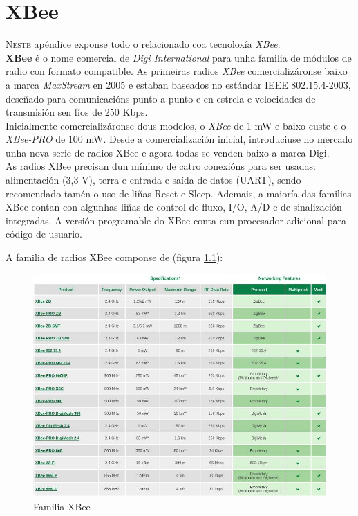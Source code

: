 \chapter{XBee}
\label{chap:xbee}


\lettrine{N}{este} apéndice exponse todo o relacionado coa tecnoloxía
\textit{XBee}. \\

\textbf{XBee} \cite{XBee} é o nome comercial de \textit{Digi International}
para unha familia de módulos de radio con formato compatible. As primeiras
radios \textit{XBee} comercializáronse baixo a marca \textit{MaxStream} en 2005
e estaban baseados no estándar IEEE 802.15.4-2003, deseñado para comunicacións
punto a punto e en estrela e velocidades de transmisión sen fíos de 250 Kbps. \\

Inicialmente comercializáronse dous modelos, o \textit{XBee} de 1 mW e baixo
custe e o \textit{XBee-PRO} de 100 mW. Desde a comercialización inicial,
introduciuse no mercado unha nova serie de radios XBee e agora todas se venden
baixo a marca Digi. \\

As radios XBee precisan dun mínimo de catro conexións para ser usadas:
alimentación (3,3 V), terra e entrada e saída de datos (UART), sendo
recomendado tamén o uso de liñas Reset e Sleep. Ademais, a maioría das familias
XBee contan con algunhas liñas de control de fluxo, I/O, A/D e de sinalización
integradas. A versión programable do XBee conta cun procesador adicional para
código de usuario.

A familia de radios XBee componse de (figura \ref{figura:FamiliaXbee}):

\begin{figure}[htbp]
 \centering
 \includegraphics[scale=0.5,keepaspectratio=true]{./imagenes/familia-xbee.png}
 \caption{Familia XBee \cite{XBee}.}
 \label{figura:FamiliaXbee}
\end{figure}

